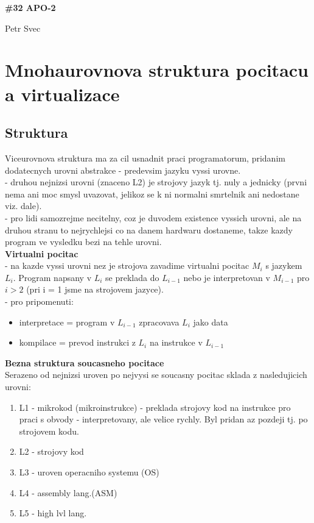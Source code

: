 \documentclass[10pt]{article}
\begin{document}
\begin{center}
\begin{LARGE}
\textbf{\#32 APO-2}\\
\end{LARGE}
Petr Svec
\end{center}

\section*{Mnohaurovnova struktura pocitacu a virtualizace}
\subsection*{Struktura}
Viceurovnova struktura ma za cil usnadnit praci programatorum, pridanim dodatecnych urovni abstrakce - predevsim jazyku vyssi urovne.\\

- druhou nejnizsi urovni (znaceno L2) je strojovy jazyk tj. nuly a jednicky (prvni nema ani moc smysl uvazovat, jelikoz se k ni normalni smrtelnik ani nedostane viz. dale).\\
- pro lidi samozrejme necitelny, coz je duvodem existence vyssich urovni, ale na druhou stranu to nejrychlejsi co na danem hardwaru dostaneme, takze kazdy program ve vysledku bezi na tehle urovni.\\[10pt]
\textbf{Virtualni pocitac}\\
- na kazde vyssi urovni nez je strojova zavadime virtualni pocitac $M_i$ s jazykem $L_i$. Program napsany v $L_i$ se preklada do $L_{i-1}$ nebo je interpretovan v $M_{i-1}$ pro $i > 2$ (pri i = 1 jsme na strojovem jazyce).\\
- pro pripomenuti:
\begin{itemize}
\item interpretace = program v $L_{i-1}$ zpracovava $L_i$ jako data
\item kompilace = prevod instrukci z $L_i$ na instrukce v $L_{i-1}$
\end{itemize}

\textbf{Bezna struktura soucasneho pocitace}\\
Serazeno od nejnizsi uroven po nejvysi se soucasny pocitac sklada z nasledujicich urovni:
\begin{enumerate}
\item L1 - mikrokod (mikroinstrukce) - preklada strojovy kod na instrukce pro praci s obvody - interpretovany, ale velice rychly. Byl pridan az pozdeji tj. po strojovem kodu.
\item L2 - strojovy kod
\item L3 - uroven operacniho systemu (OS)
\item L4 - assembly lang.(ASM)
\item L5 - high lvl lang. 

\end{enumerate}
\end{document}
